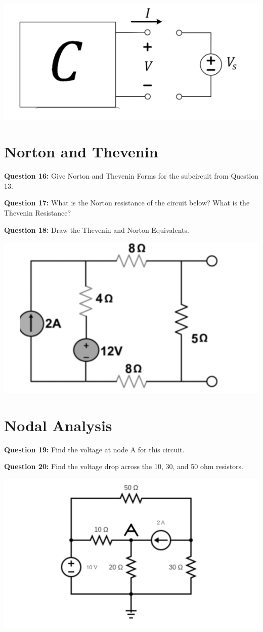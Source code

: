 \documentclass{article}
\begin{document}
\begin{center}
    \includegraphics[width=0.75\linewidth]{figures/14.png}

\end{center}

\section*{Norton and Thevenin}
\textbf{Question 16:} Give Norton and Thevenin Forms for the subcircuit from Question 13.

\textbf{Question 17:} What is the Norton resistance of the circuit below? What is the Thevenin Resistance?

\textbf{Question 18:} Draw the Thevenin and Norton Equivalents.

\begin{center}
    \includegraphics[width=0.75\linewidth]{figures/23.png}

\end{center}

\section*{Nodal Analysis}
\textbf{Question 19:} Find the voltage at node A for this circuit.

\textbf{Question 20:} Find the voltage drop across the 10, 30, and 50 ohm resistors.

\begin{center}
    \includegraphics[width=0.75\linewidth]{figures/34.png}
\end{center}
\end{document}
